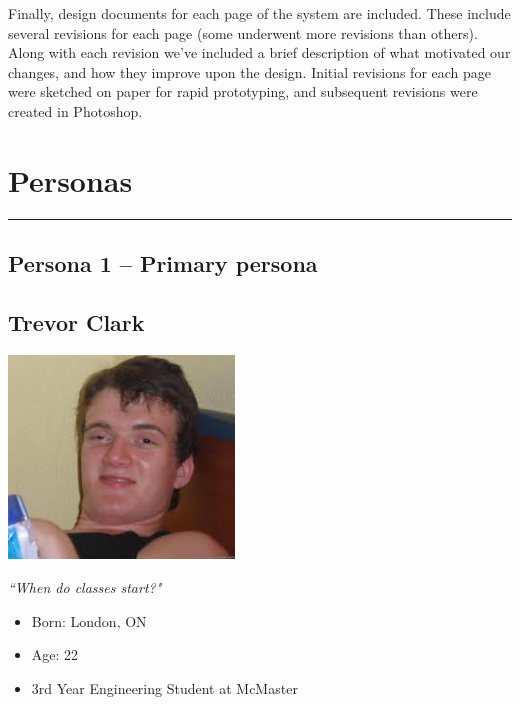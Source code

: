 \documentclass[12pt]{article}
\begin{document}
Finally, design documents for each page of the system are included. These include several revisions for each page (some underwent more revisions than others). Along with each revision we've included a brief description of what motivated our changes, and how they improve upon the design. Initial revisions for each page were sketched on paper for rapid prototyping, and subsequent revisions were created in Photoshop.


\newpage
\section{Personas}
\vspace{5mm}
\hrule
\vspace{2mm}
\subsection{Persona 1 -- Primary persona}
\vspace{11mm}

\subsection*{Trevor Clark}
\vspace{4mm}

\begin{minipage}{60mm}
\includegraphics[width=60mm]{Trevor.jpg}
\begin{center}
\emph{``When do classes start?"}
\end{center}
\end{minipage}
\begin{minipage}{\textwidth}
\begin{itemize}
\item Born: London, ON
\item Age: 22
\item 3rd Year Engineering Student at McMaster
\end{itemize}
\end{minipage}\\\\\\
\end{document}
